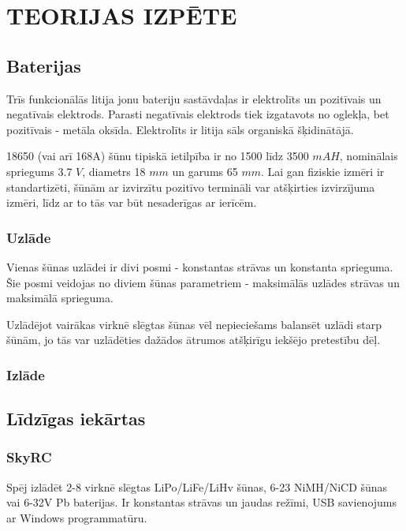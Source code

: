 \documentclass[12pt,fleqn,titlepage,oneside]{article}
\numberwithin{equation}{section}
\numberwithin{figure}{section}
\numberwithin{table}{section}
\begin{document}
\FloatBarrier
\newpage

\section{\texorpdfstring{\MakeUppercase{Teorijas izpēte}}{Teorijas izpēte}}

\subsection{Baterijas}

Trīs funkcionālās litija jonu bateriju sastāvdaļas ir elektrolīts un pozitīvais un negatīvais elektrods.
Parasti negatīvais elektrods tiek izgatavots no oglekļa, bet pozitīvais - metāla oksīda.
Elektrolīts ir litija sāls organiskā šķidinātājā.

18650 (vai arī 168A) šūnu tipiskā ietilpība ir no 1500 līdz 3500 $mAH$, nominālais spriegums 3.7 $V$,
diametrs 18 $mm$ un garums 65 $mm$.\cite{18650cell}
Lai gan fiziskie izmēri ir standartizēti, šūnām ar izvirzītu pozitīvo termināli var atšķirties izvirzījuma izmēri,
līdz ar to tās var būt nesaderīgas ar ierīcēm.

\subsubsection{Uzlāde}

Vienas šūnas uzlādei ir divi posmi - konstantas strāvas un konstanta sprieguma.
Šie posmi veidojas no diviem šūnas parametriem - maksimālās uzlādes strāvas un maksimālā sprieguma.

Uzlādējot vairākas virknē slēgtas šūnas vēl nepieciešams balansēt uzlādi starp šūnām, 
jo tās var uzlādēties dažādos ātrumos atšķirīgu iekšējo pretestību dēļ.

\subsubsection{Izlāde}


\subsection{Līdzīgas iekārtas}


\subsubsection{SkyRC}

Spēj izlādēt 2-8 virknē slēgtas LiPo/LiFe/LiHv šūnas, 6-23 NiMH/NiCD šūnas vai 6-32V Pb baterijas.
Ir konstantas strāvas un jaudas režīmi, USB savienojums ar Windows programmatūru.
\end{document}
